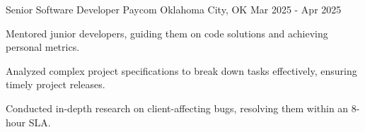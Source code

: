   \cventry
    {Senior Software Developer} %
    {Paycom} %
    {Oklahoma City, OK} %
    {Mar 2025 - Apr 2025} %
    {
      \begin{cvitems} %
        \item{Mentored junior developers, guiding them on code solutions and achieving personal metrics.}
        \item{Analyzed complex project specifications to break down tasks effectively, ensuring timely project releases.}
        \item {Conducted in-depth research on client-affecting bugs, resolving them within an 8-hour SLA.}
      \end{cvitems}
    }
